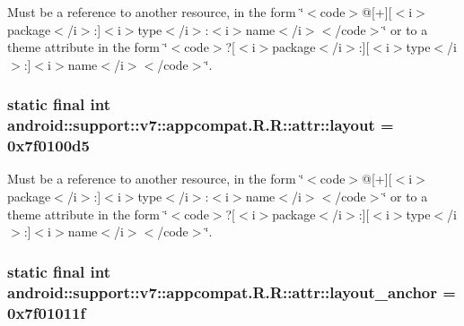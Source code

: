 Must be a reference to another resource, in the form \char`\"{}$<$code$>$@\mbox{[}+\mbox{]}\mbox{[}$<$i$>$package$<$/i$>$:\mbox{]}$<$i$>$type$<$/i$>$:$<$i$>$name$<$/i$>$$<$/code$>$\char`\"{} or to a theme attribute in the form \char`\"{}$<$code$>$?\mbox{[}$<$i$>$package$<$/i$>$:\mbox{]}\mbox{[}$<$i$>$type$<$/i$>$:\mbox{]}$<$i$>$name$<$/i$>$$<$/code$>$\char`\"{}. \hypertarget{classandroid_1_1support_1_1v7_1_1appcompat_1_1_r_1_1attr_3b4bbe86d96dac362ce866e10256357e}{
\subsubsection[{layout}]{\setlength{\rightskip}{0pt plus 5cm}static final int android::support::v7::appcompat.R.R::attr::layout = 0x7f0100d5}}
\label{classandroid_1_1support_1_1v7_1_1appcompat_1_1_r_1_1attr_3b4bbe86d96dac362ce866e10256357e}


Must be a reference to another resource, in the form \char`\"{}$<$code$>$@\mbox{[}+\mbox{]}\mbox{[}$<$i$>$package$<$/i$>$:\mbox{]}$<$i$>$type$<$/i$>$:$<$i$>$name$<$/i$>$$<$/code$>$\char`\"{} or to a theme attribute in the form \char`\"{}$<$code$>$?\mbox{[}$<$i$>$package$<$/i$>$:\mbox{]}\mbox{[}$<$i$>$type$<$/i$>$:\mbox{]}$<$i$>$name$<$/i$>$$<$/code$>$\char`\"{}. \hypertarget{classandroid_1_1support_1_1v7_1_1appcompat_1_1_r_1_1attr_6a44f9677905033a02669f6930535abf}{
\subsubsection[{layout\_\-anchor}]{\setlength{\rightskip}{0pt plus 5cm}static final int android::support::v7::appcompat.R.R::attr::layout\_\-anchor = 0x7f01011f}}
\label{classandroid_1_1support_1_1v7_1_1appcompat_1_1_r_1_1attr_6a44f9677905033a02669f6930535abf}


